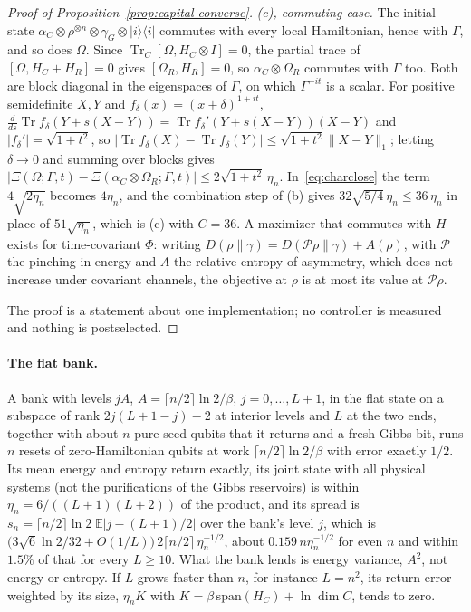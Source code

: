 \documentclass[11pt]{article}
\theoremstyle{definition}
\theoremstyle{remark}
\newcommand{\Tr}{\operatorname{Tr}}
\begin{document}
\begin{proof}[Proof of Proposition~\ref{prop:capital-converse}]
\emph{(c), commuting case.} The initial state $\alpha_C\otimes\rho^{\otimes n}\otimes\gamma_G\otimes|i\rangle\langle i|$ commutes with every local Hamiltonian, hence with $\Gamma$, and so does $\Omega$. Since $\Tr_C[\Omega,H_C\otimes I]=0$, the partial trace of $[\Omega,H_C+H_R]=0$ gives $[\Omega_R,H_R]=0$, so $\alpha_C\otimes\Omega_R$ commutes with $\Gamma$ too. Both are block diagonal in the eigenspaces of $\Gamma$, on which $\Gamma^{-it}$ is a scalar. For positive semidefinite $X,Y$ and $f_\delta(x)=(x+\delta)^{1+it}$, $\frac{d}{ds}\Tr f_\delta(Y+s(X-Y))=\Tr f_\delta'(Y+s(X-Y))(X-Y)$ and $|f_\delta'|=\sqrt{1+t^2}$, so $|\Tr f_\delta(X)-\Tr f_\delta(Y)|\le\sqrt{1+t^2}\|X-Y\|_1$; letting $\delta\to0$ and summing over blocks gives $|\Xi(\Omega;\Gamma,t)-\Xi(\alpha_C\otimes\Omega_R;\Gamma,t)|\le2\sqrt{1+t^2}\,\eta_n$. In~\eqref{eq:charclose} the term $4\sqrt{2\eta_n}$ becomes $4\eta_n$, and the combination step of (b) gives $32\sqrt{5/4}\,\eta_n\le36\,\eta_n$ in place of $51\sqrt{\eta_n}$, which is (c) with $C=36$. A maximizer that commutes with $H$ exists for time-covariant $\Phi$: writing $D(\rho\|\gamma)=D(\mathcal P\rho\|\gamma)+A(\rho)$, with $\mathcal P$ the pinching in energy and $A$ the relative entropy of asymmetry, which does not increase under covariant channels, the objective at $\rho$ is at most its value at $\mathcal P\rho$.

The proof is a statement about one implementation; no controller is measured and nothing is postselected.
\end{proof}

\paragraph{The flat bank.} A bank with levels $jA$, $A=\lceil n/2\rceil\ln2/\beta$, $j=0,\dots,L+1$, in the flat state on a subspace of rank $2j(L+1-j)-2$ at interior levels and $L$ at the two ends, together with about $n$ pure seed qubits that it returns and a fresh Gibbs bit, runs $n$ resets of zero-Hamiltonian qubits at work $\lceil n/2\rceil\ln2/\beta$ with error exactly $1/2$. Its mean energy and entropy return exactly, its joint state with all physical systems (not the purifications of the Gibbs reservoirs) is within $\eta_n=6/((L+1)(L+2))$ of the product, and its spread is $s_n=\lceil n/2\rceil\ln2\;\mathbb E|j-(L+1)/2|$ over the bank's level $j$, which is $\bigl(3\sqrt6\ln2/32+O(1/L)\bigr)\,2\lceil n/2\rceil\,\eta_n^{-1/2}$, about $0.159\,n\eta_n^{-1/2}$ for even $n$ and within $1.5\%$ of that for every $L\ge10$. What the bank lends is energy variance, $A^2$, not energy or entropy. If $L$ grows faster than $n$, for instance $L=n^2$, its return error weighted by its size, $\eta_nK$ with $K=\beta\,\mathrm{span}(H_C)+\ln\dim C$, tends to zero.
\end{document}
